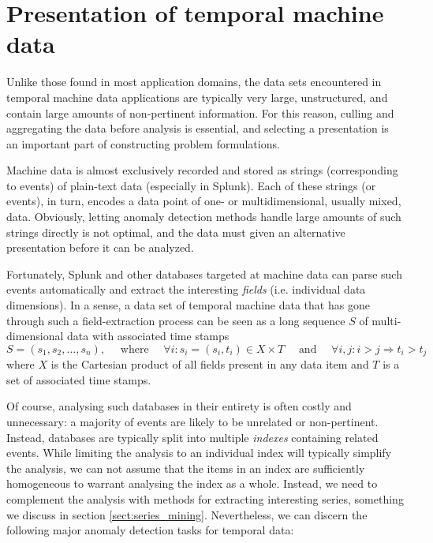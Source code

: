 \section{Presentation of temporal machine data}
\label{sect:splunk_techniques}

Unlike those found in most application domains, the data sets encountered in temporal machine data applications are typically very large, unstructured, and contain large amounts of non-pertinent information. For this reason, culling and aggregating the data before analysis is essential, and selecting a presentation is an important part of constructing problem formulations.

Machine data is almost exclusively recorded and stored as strings (corresponding to events) of plain-text data (especially in Splunk). Each of these strings (or events), in turn, encodes a data point of one- or multidimensional, usually mixed, data. Obviously, letting anomaly detection methods handle large amounts of such strings directly is not optimal, and the data must given an alternative presentation before it can be analyzed.

Fortunately, Splunk and other databases targeted at machine data can parse such events automatically and extract the interesting \emph{fields} (i.e. individual data dimensions). In a sense, a data set of temporal machine data that has gone through such a field-extraction process can be seen as a long sequence $S$ of multi-dimensional data with associated time stamps
\[
  S = (s_1, s_2, \dots, s_n), \quad \text{ where } \quad \forall i: s_i = (s_i, t_i) \in X \times T \quad \text{ and } \quad \forall i,j: i > j \Rightarrow t_i > t_j
\]
where $X$ is the Cartesian product of all fields present in any data item and $T$ is a set of associated time stamps.

Of course, analysing such databases in their entirety is often costly and unnecessary: a majority of events are likely to be unrelated or non-pertinent. Instead, databases are typically split into multiple \emph{indexes} containing related events. While limiting the analysis to an individual index will typically simplify the analysis, we can not assume that the items in an index are sufficiently homogeneous to warrant analysing the index as a whole. Instead, we need to complement the analysis with methods for extracting interesting series, something we discuss in section \ref{sect:series_mining}. Nevertheless, we can discern the following major anomaly detection tasks for temporal data:

